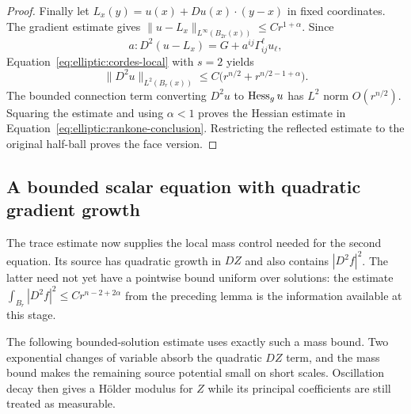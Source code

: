 \begin{proof}
Finally let $L_x(y)=u(x)+Du(x)\cdot(y-x)$ in fixed coordinates.
The gradient estimate gives
$\|u-L_x\|_{L^\infty(B_{2r}(x))}\leq Cr^{1+\alpha}$.
Since
\[
 a:D^2(u-L_x)=G+a^{ij}\Gamma^\ell_{ij}u_\ell,
\]
Equation~\eqref{eq:elliptic:cordes-local} with $s=2$ yields
\[
 \|D^2u\|_{L^2(B_r(x))}
   \leq C\bigl(r^{n/2}+r^{n/2-1+\alpha}\bigr).
\]
The bounded connection term converting $D^2u$ to $\operatorname{Hess}_g u$ has
$L^2$ norm $O(r^{n/2})$.  Squaring the estimate and using $\alpha<1$
proves the Hessian estimate in
Equation~\eqref{eq:elliptic:rankone-conclusion}.  Restricting the reflected
estimate to the original half-ball proves the face version.
\end{proof}


\subsection{A bounded scalar equation with quadratic gradient growth}

The trace estimate now supplies the local mass control needed for
the second equation.  Its source has quadratic growth in $DZ$ and
also contains $|D^2f|^2$.  The latter need not yet have a pointwise
bound uniform over solutions: the estimate
$\int_{B_r}|D^2f|^2\le Cr^{n-2+2\alpha}$ from the preceding lemma
is the information available at this stage.

The following bounded-solution estimate uses exactly such a mass
bound.  Two exponential changes of variable absorb the quadratic
$DZ$ term, and the mass bound makes the remaining source potential
small on short scales.  Oscillation decay then gives a H\"older
modulus for $Z$ while its principal coefficients are still treated
as measurable.

